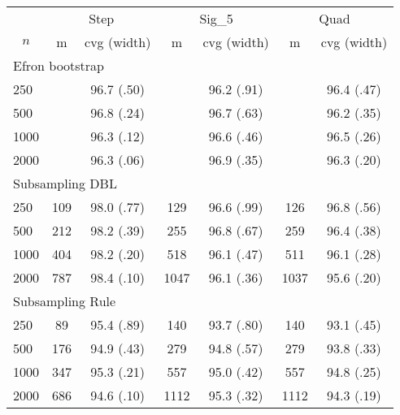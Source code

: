 \documentclass{article}
\begin{document}
\begin{tabular}{lcccccc}
   \toprule
 
           & \multicolumn{2}{c}{Step}& \multicolumn{2}{c}{Sig\_5}& \multicolumn{2}{c}{Quad} \\ 
             \cmidrule(l{2pt}r{2pt}){2-3} \cmidrule(l{2pt}r{2pt}){4-5} \cmidrule(l{2pt}r{2pt}){6-7} 
             \multicolumn{1}{c}{$n$} & \multicolumn{1}{c}{m}& \multicolumn{1}{c}{cvg (width)}& \multicolumn{1}{c}{m}& \multicolumn{1}{c}{cvg (width)}& \multicolumn{1}{c}{m}& \multicolumn{1}{c}{cvg (width)} \\ \midrule 
             \hline   
 \multicolumn{7}{l}{Efron bootstrap} \\ 
250 &  & 96.7 (.50) &  & 96.2 (.91) &  & 96.4 (.47) \\ 
  500 &  & 96.8 (.24) &  & 96.7 (.63) &  & 96.2 (.35) \\ 
  1000 &  & 96.3 (.12) &  & 96.6 (.46) &  & 96.5 (.26) \\ 
  2000 &  & 96.3 (.06) &  & 96.9 (.35) &  & 96.3 (.20) \\ 
       \hline   
 \multicolumn{7}{l}{Subsampling DBL} \\ 
250 & 109 & 98.0 (.77) & 129 & 96.6 (.99) & 126 & 96.8 (.56) \\ 
  500 & 212 & 98.2 (.39) & 255 & 96.8 (.67) & 259 & 96.4 (.38) \\ 
  1000 & 404 & 98.2 (.20) & 518 & 96.1 (.47) & 511 & 96.1 (.28) \\ 
  2000 & 787 & 98.4 (.10) & 1047 & 96.1 (.36) & 1037 & 95.6 (.20) \\ 
       \hline   
 \multicolumn{7}{l}{Subsampling Rule} \\ 
250 & 89 & 95.4 (.89) & 140 & 93.7 (.80) & 140 & 93.1 (.45) \\ 
  500 & 176 & 94.9 (.43) & 279 & 94.8 (.57) & 279 & 93.8 (.33) \\ 
  1000 & 347 & 95.3 (.21) & 557 & 95.0 (.42) & 557 & 94.8 (.25) \\ 
  2000 & 686 & 94.6 (.10) & 1112 & 95.3 (.32) & 1112 & 94.3 (.19) \\ 
   \hline
\end{tabular}
\end{document}
